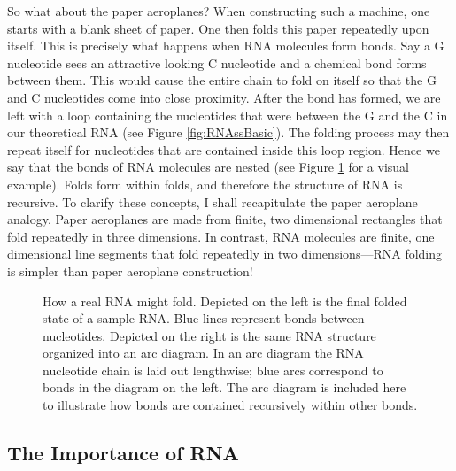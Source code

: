 \documentclass[12pt, a4paper]{article}
\begin{document}
So what about the paper aeroplanes? When constructing such a machine, one starts with a blank sheet of paper. One then folds this paper repeatedly upon itself. This is precisely what happens when RNA molecules form bonds. Say a G nucleotide sees an attractive looking C nucleotide and a chemical bond forms between them. This would cause the entire chain to fold on itself so that the G and C nucleotides come into close proximity. After the bond has formed, we are left with a loop containing the nucleotides that were between the G and the C in our theoretical RNA (see Figure \ref{fig:RNAssBasic}). The folding process may then repeat itself for nucleotides that are contained inside this loop region. Hence we say that the bonds of RNA molecules are nested (see Figure \ref{fig:RNAss} for a visual example). Folds form within folds, and therefore the structure of RNA is recursive. To clarify these concepts, I shall recapitulate the paper aeroplane analogy. Paper aeroplanes are made from finite, two dimensional rectangles that fold repeatedly in three dimensions. In contrast, RNA molecules are finite, one dimensional line segments that fold repeatedly in two dimensions---RNA folding is simpler than paper aeroplane construction!


\begin{figure}
\begin{center}
\end{center}
\caption{How a real RNA might fold. Depicted on the left is the final folded state of a sample RNA. Blue lines represent bonds between nucleotides. Depicted on the right is the same RNA structure organized into an arc diagram. In an arc diagram the RNA nucleotide chain is laid out lengthwise; blue arcs correspond to bonds in the diagram on the left. The arc diagram is included here to illustrate how bonds are contained recursively within other bonds.}
\label{fig:RNAss}
\end{figure}

\subsection{The Importance of RNA}
\end{document}
